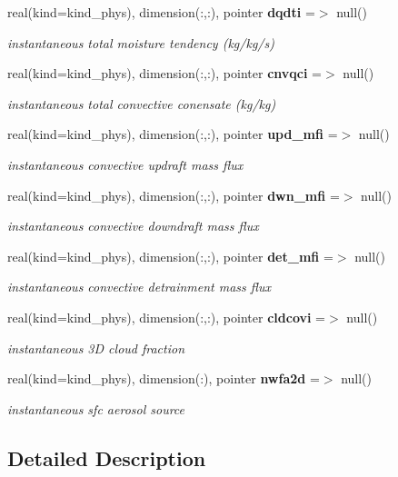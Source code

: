\begin{DoxyCompactItemize}
\item 
real(kind=kind\+\_\+phys), dimension(\+:,\+:), pointer \textbf{ dqdti} =$>$ null()
\begin{DoxyCompactList}\small\item\em instantaneous total moisture tendency (kg/kg/s) \end{DoxyCompactList}\item 
real(kind=kind\+\_\+phys), dimension(\+:,\+:), pointer \textbf{ cnvqci} =$>$ null()
\begin{DoxyCompactList}\small\item\em instantaneous total convective conensate (kg/kg) \end{DoxyCompactList}\item 
real(kind=kind\+\_\+phys), dimension(\+:,\+:), pointer \textbf{ upd\+\_\+mfi} =$>$ null()
\begin{DoxyCompactList}\small\item\em instantaneous convective updraft mass flux \end{DoxyCompactList}\item 
real(kind=kind\+\_\+phys), dimension(\+:,\+:), pointer \textbf{ dwn\+\_\+mfi} =$>$ null()
\begin{DoxyCompactList}\small\item\em instantaneous convective downdraft mass flux \end{DoxyCompactList}\item 
real(kind=kind\+\_\+phys), dimension(\+:,\+:), pointer \textbf{ det\+\_\+mfi} =$>$ null()
\begin{DoxyCompactList}\small\item\em instantaneous convective detrainment mass flux \end{DoxyCompactList}\item 
real(kind=kind\+\_\+phys), dimension(\+:,\+:), pointer \textbf{ cldcovi} =$>$ null()
\begin{DoxyCompactList}\small\item\em instantaneous 3D cloud fraction \end{DoxyCompactList}\item 
real(kind=kind\+\_\+phys), dimension(\+:), pointer \textbf{ nwfa2d} =$>$ null()
\begin{DoxyCompactList}\small\item\em instantaneous sfc aerosol source \end{DoxyCompactList}\end{DoxyCompactItemize}


\subsection{Detailed Description}


